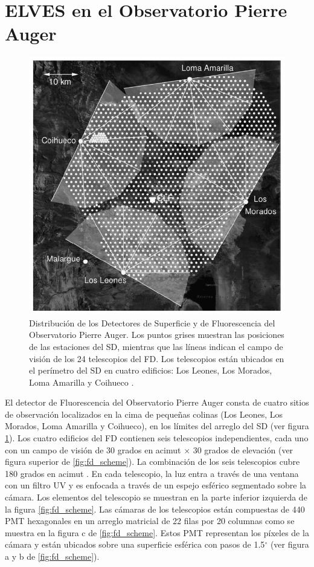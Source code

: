 \documentclass[11pt,oneside,openany,letter]{book}
\begin{document}
\section{ELVES en el Observatorio Pierre Auger}
\begin{figure}
    \centering
    \includegraphics[scale=0.5]{figures/auger_sites.png}
    \caption[Distribuci\'on de los Detectores de Superficie y Fluorescencia del Observatorio Pierre Auger.]{Distribuci\'on de los Detectores de Superficie y de Fluorescencia del Observatorio Pierre Auger. Los puntos grises muestran las posiciones de las estaciones del SD, mientras que las l\'ineas indican el campo de visi\'on de los 24 telescopios del FD. Los telescopios est\'an ubicados en el per\'imetro del SD en cuatro edificios: Los Leones, Los Morados, Loma Amarilla y Coihueco \cite{AbrahamEtal2010}. }
    \label{fig:auger_sites}
\end{figure}
El detector de Fluorescencia del Observatorio Pierre Auger consta de cuatro sitios de observaci\'on localizados en la cima de pequeñas colinas (Los Leones, Los Morados, Loma Amarilla y Coihueco), en los límites del arreglo del SD (ver figura \ref{fig:auger_sites}). Los cuatro edificios del FD contienen seis telescopios independientes, cada uno con un campo de visión de 30 grados en acimut $\times$ 30 grados de elevación (ver figura superior de \ref{fig:fd_scheme}). La combinación de los seis telescopios cubre 180 grados en acimut \cite{AbrahamEtal2010}. En cada telescopio, la luz entra a través de una ventana con un filtro UV y es enfocada a través de un espejo esférico segmentado sobre la cámara. Los elementos del telescopio se muestran en la parte inferior izquierda de la figura \ref{fig:fd_scheme}. Las c\'amaras de los telescopios est\'an compuestas de 440 PMT hexagonales en un arreglo matricial de 22 filas por 20 columnas como se muestra en la figura c de \ref{fig:fd_scheme}. Estos PMT representan los p\'ixeles de la c\'amara y est\'an ubicados sobre una superficie esf\'erica con pasos de 1.5$^\circ$ \cite{AbrahamEtal2010} (ver figura a y b de \ref{fig:fd_scheme}). 
\end{document}
